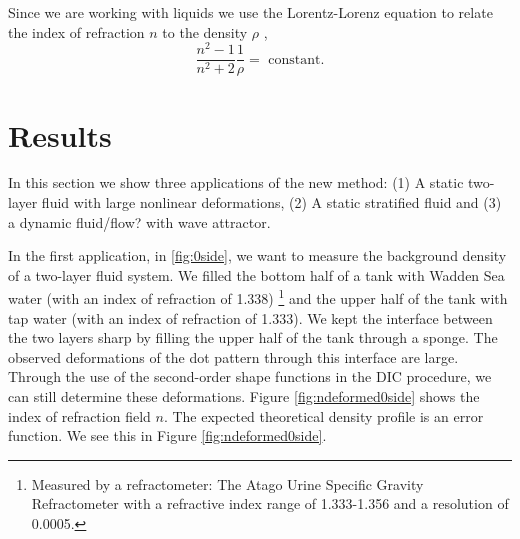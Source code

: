 \documentclass{article}
\begin{document}
Since we are working with liquids we use the Lorentz-Lorenz equation to relate the index of refraction $n$ to the density $\rho$ \cite{lorentz1916theory, tan2015dependence},
\begin{equation}
 	\frac{n^2-1}{n^2+2} \frac{1}{\rho} = \mbox{ constant}.
\end{equation}

\section{Results}
In this section we show three applications of the new method: (1) A static two-layer fluid with large nonlinear deformations, (2) A static stratified fluid and (3) a dynamic fluid/flow? with wave attractor.

In the first application, in \ref{fig:0side}, we want to measure the background density of a two-layer fluid system. We filled the bottom half of a tank with Wadden Sea water (with an index of refraction of 1.338) \footnote{Measured by a refractometer: The Atago Urine Specific Gravity Refractometer with a refractive index range of 1.333-1.356 and a resolution of 0.0005.} and the upper half of the tank with tap water (with an index of refraction of 1.333). We kept the interface between the two layers sharp by filling the upper half of the tank through a sponge. The observed deformations of the dot pattern through this interface are large. Through the use of the second-order shape functions in the DIC procedure, we can still determine these deformations. Figure \ref{fig:ndeformed0side} shows the index of refraction field $n$. The expected theoretical density profile is an error function. We see this in Figure \ref{fig:ndeformed0side}.
\end{document}
